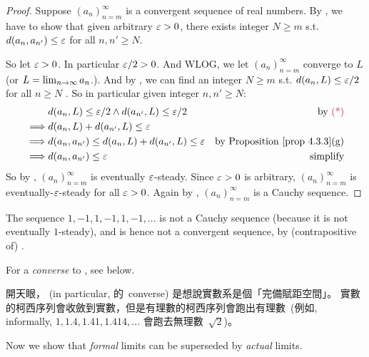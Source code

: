 \begin{proof}
Suppose \((a_n)_{n = m}^{\infty}\) is a convergent sequence of real numbers.
By , we have to show that given arbitrary \(\varepsilon > 0\), there exists integer \(N \ge m\) s.t. \(d(a_n, a_{n'}) \le \varepsilon\) for all \(n, n' \ge N\).

So let \(\varepsilon > 0\).
In particular \(\varepsilon/2 > 0\).
And WLOG, we let \((a_n)_{n = m}^{\infty}\) converge to \(L\) (or \(L = \lim_{n \to \infty} a_n\).).
And by , we can find an integer \(N \ge m\) s.t. \(d(a_n, L) \le \varepsilon/2\) for all \(n \ge N\) \MAROON{(*)}.
So in particular given integer \(n, n' \ge N\):
\begin{align*}
             & d(a_n, L) \le \varE/2 \land d(a_{n'}, L) \le \varE/2 & \text{by \MAROON{(*)}} \\
    \implies & d(a_n, L) + d(a_{n'}, L) \le \varE \\
    \implies & d(a_n, a_{n'}) \le d(a_n, L) + d(a_{n'}, L) \le \varE & \text{by \PROP{4.3.3}(g)} \\
    \implies & d(a_n, a_{n'}) \le \varE & \text{simplify}
\end{align*}
So by , \((a_n)_{n = m}^{\infty}\) is eventually \(\varepsilon\)-steady.
Since \(\varepsilon > 0\) is arbitrary, \((a_n)_{n = m}^{\infty}\) is eventually-\(\varepsilon\)-steady for all \(\varepsilon > 0\).
Again by , \((a_n)_{n = m}^{\infty}\) is a Cauchy sequence.
\end{proof}

\begin{example} \label{example 6.1.13}
The sequence \(1, -1, 1, -1, 1, -1,...\) is not a Cauchy sequence (because it is not eventually \(1\)-steady), and is hence not a
convergent sequence, by (contrapositive of) .
\end{example}

\begin{remark} \label{remark 6.1.14}
For a \emph{converse} to , see  below.
\end{remark}

\begin{note}
開天眼， (in particular,  的\ converse) 是想說實數系是個「完備賦距空間」。
實數的柯西序列會收斂到實數，但是有理數的柯西序列會跑出有理數\
(例如, informally, \(1, 1.4, 1.41, 1.414,...\) 會跑去無理數\ \(\sqrt{2}\))。
\end{note}

Now we show that \emph{formal} limits can be superseded by \emph{actual} limits.

